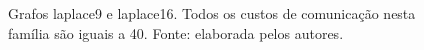 \documentclass[fleqn,10pt]{SelfArx} %
\begin{document}
\begin{figure}
  \centering
  \caption{Grafos laplace9 e laplace16. Todos os custos de comunicação nesta família são iguais a 40. Fonte: elaborada pelos autores.}
  \label{fig:laplace}
\end{figure}
\end{document}
